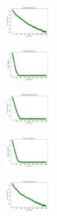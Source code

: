 \begin{figure}[H]
\begin{subfigure}
    \end{subfigure}
    \hfill
    \begin{subfigure}
        \centering
        \includegraphics[width=0.234\textwidth]{img/aggsf/ecoli_set_const_20_589741062_cost.png}
    \end{subfigure}
    \hfill
    \begin{subfigure}
        \centering
        \includegraphics[width=0.234\textwidth]{img/aggsf/rand_set_const_20_589741062_cost.png}
    \end{subfigure}
    \hfill
    \begin{subfigure}
        \centering
        \includegraphics[width=0.234\textwidth]{img/aggsf/newthyroid_set_const_20_589741062_cost.png}
    \end{subfigure}
    \hfill
    \begin{subfigure}
        \centering
        \includegraphics[width=0.234\textwidth]{img/aggsf/iris_set_const_20_277451237_cost.png}
    \end{subfigure}
    \hfill
    \begin{subfigure}
        \centering
        \includegraphics[width=0.234\textwidth]{img/aggsf/ecoli_set_const_20_277451237_cost.png}
    \end{subfigure}
    \hfill

\end{figure}
